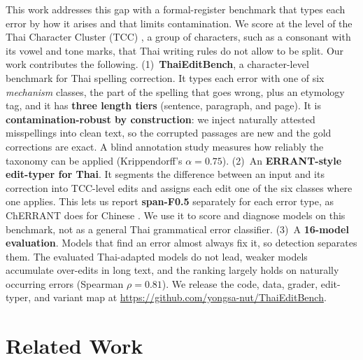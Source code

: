 \documentclass[11pt]{article}
\begin{document}
This work addresses this gap with a formal-register benchmark that types each error by how it
arises and that limits contamination. We score at the level of the Thai Character Cluster (TCC)
\citep{theeramunkong-etal-2000-character}, a group of characters, such as a consonant with its
vowel and tone marks, that Thai writing rules do not allow to be split. Our work contributes the
following.
(1)~\textbf{ThaiEditBench}, a character-level benchmark for Thai spelling correction. It types
each error with one of six \emph{mechanism} classes, the part of the spelling that goes wrong,
plus an etymology tag, and it has \textbf{three length tiers} (sentence, paragraph, and page). It
is \textbf{contamination-robust by construction}: we inject naturally attested misspellings into
clean text, so the corrupted passages are new and the gold corrections are exact. A blind
annotation study measures how reliably the taxonomy can be applied (Krippendorff's
$\alpha = 0.75$).
(2)~An \textbf{ERRANT-style edit-typer for Thai}. It segments the difference between an input and its
correction into TCC-level edits and assigns each edit one of the six classes where one applies. This lets us report
\textbf{span-F0.5} separately for each error type, as ChERRANT does for Chinese
\citep{zhang-etal-2022-mucgec}. We use it to score and diagnose models on this benchmark, not as
a general Thai grammatical error classifier.
(3)~A \textbf{16-model evaluation}. Models that find an error almost always fix it, so detection
separates them. The evaluated Thai-adapted models do not lead, weaker models accumulate
over-edits in long text, and the ranking largely holds on naturally occurring errors
(Spearman $\rho = 0.81$).
We release the code, data, grader, edit-typer, and variant map at
\url{https://github.com/yongsa-nut/ThaiEditBench}.

\section{Related Work}
\end{document}
